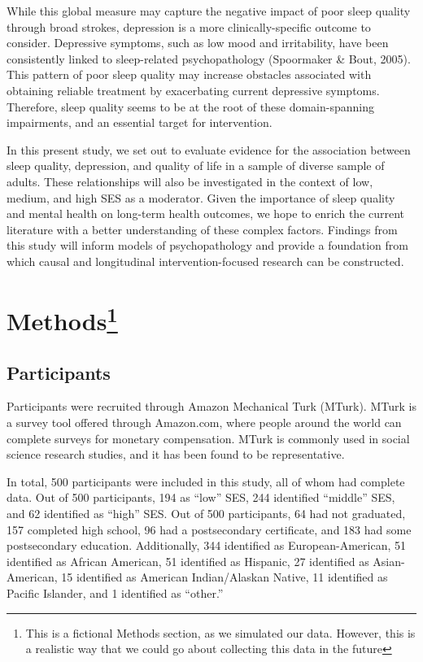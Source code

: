 \documentclass[man, noextraspace]{apa6}
\let\rmarkdownfootnote\footnote%
\def\footnote{\protect\rmarkdownfootnote}
\theoremstyle{definition}
\theoremstyle{definition}
\theoremstyle{definition}
\theoremstyle{remark}
\begin{document}
While this global measure may capture the negative impact of poor sleep
quality through broad strokes, depression is a more clinically-specific
outcome to consider. Depressive symptoms, such as low mood and
irritability, have been consistently linked to sleep-related
psychopathology (Spoormaker \& Bout, 2005). This pattern of poor sleep
quality may increase obstacles associated with obtaining reliable
treatment by exacerbating current depressive symptoms. Therefore, sleep
quality seems to be at the root of these domain-spanning impairments,
and an essential target for intervention.

In this present study, we set out to evaluate evidence for the
association between sleep quality, depression, and quality of life in a
sample of diverse sample of adults. These relationships will also be
investigated in the context of low, medium, and high SES as a moderator.
Given the importance of sleep quality and mental health on long-term
health outcomes, we hope to enrich the current literature with a better
understanding of these complex factors. Findings from this study will
inform models of psychopathology and provide a foundation from which
causal and longitudinal intervention-focused research can be
constructed.

\section{\texorpdfstring{Methods\footnote{This is a fictional Methods section, as we simulated our data. However, this is a realistic way that we could go about collecting this data in the future}}{Methods}}\label{methods}

\subsection{Participants}\label{participants}

Participants were recruited through Amazon Mechanical Turk (MTurk).
MTurk is a survey tool offered through Amazon.com, where people around
the world can complete surveys for monetary compensation. MTurk is
commonly used in social science research studies, and it has been found
to be representative.

In total, 500 participants were included in this study, all of whom had
complete data. Out of 500 participants, 194 as \enquote{low} SES, 244
identified \enquote{middle} SES, and 62 identified as \enquote{high}
SES. Out of 500 participants, 64 had not graduated, 157 completed high
school, 96 had a postsecondary certificate, and 183 had some
postsecondary education. Additionally, 344 identified as
European-American, 51 identified as African American, 51 identified as
Hispanic, 27 identified as Asian-American, 15 identified as American
Indian/Alaskan Native, 11 identified as Pacific Islander, and 1
identified as \enquote{other.}
\end{document}
